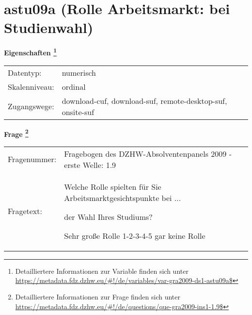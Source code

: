 
    \setcounter{footnote}{0}

    \vspace*{-1.8cm}
	\section{astu09a (Rolle Arbeitsmarkt: bei Studienwahl)}
	\label{section:astu09a}



    \vspace*{0.5cm}
    \noindent\textbf{Eigenschaften
	\footnote{Detailliertere Informationen zur Variable finden sich unter
		\url{https://metadata.fdz.dzhw.eu/\#!/de/variables/var-gra2009-ds1-astu09a$}}}\\
	\begin{tabularx}{\hsize}{@{}lX}
	Datentyp: & numerisch \\
	Skalenniveau: & ordinal \\
	Zugangswege: &
	  download-cuf, 
	  download-suf, 
	  remote-desktop-suf, 
	  onsite-suf
 \\
    \end{tabularx}



				\vspace*{0.5cm}
                \noindent\textbf{Frage
	                \footnote{Detailliertere Informationen zur Frage finden sich unter
		              \url{https://metadata.fdz.dzhw.eu/\#!/de/questions/que-gra2009-ins1-1.9$}}}\\
				\begin{tabularx}{\hsize}{@{}lX}
					Fragenummer: &
					  Fragebogen des DZHW-Absolventenpanels 2009 - erste Welle:
					  1.9
 \\
					Fragetext: & Welche Rolle spielten für Sie Arbeitsmarktgesichtspunkte bei ...\par  der Wahl Ihres Studiums?\par  Sehr große Rolle 1-2-3-4-5 gar keine Rolle \\
				\end{tabularx}





